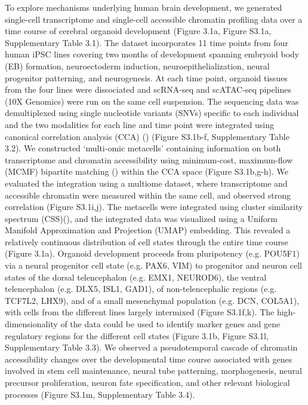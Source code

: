 To explore mechanisms underlying human brain development, we generated single-cell transcriptome and single-cell accessible chromatin profiling data over a time course of cerebral organoid development (Figure 3.1a, Figure S3.1a, Supplementary Table 3.1). The dataset incorporates 11 time points from four human iPSC lines covering two months of development spanning embryoid body (EB) formation, neuroectoderm induction, neuroepithelialization, neural progenitor patterning, and neurogenesis. At each time point, organoid tissues from the four lines were dissociated and scRNA-seq and scATAC-seq pipelines (10X Genomics) were run on the same cell suspension. The sequencing data was demultiplexed using single nucleotide variants (SNVs) specific to each individual and the two modalities for each line and time point were integrated using canonical correlation analysis (CCA) (\cite{stuart_comprehensive_2019}) (Figure S3.1b-f, Supplementary Table 3.2). We constructed ‘multi-omic metacells' containing information on both transcriptome and chromatin accessibility using minimum-cost, maximum-flow (MCMF) bipartite matching (\cite{stark_scim_2020}) within the CCA space (Figure S3.1b,g-h). We evaluated the integration using a multiome dataset, where transcriptome and accessible chromatin were measured within the same cell, and observed strong correlation (Figure S3.1i,j). The metacells were integrated using cluster similarity spectrum (CSS)(\cite{he_css_2020}), and the integrated data was visualized using a Uniform Manifold Approximation and Projection (UMAP) embedding. This revealed a relatively continuous distribution of cell states through the entire time course (Figure 3.1a). Organoid development proceeds from pluripotency (e.g. POU5F1) via a neural progenitor cell state (e.g. PAX6, VIM) to progenitor and neuron cell states of the dorsal telencephalon (e.g. EMX1, NEUROD6), the ventral telencephalon (e.g. DLX5, ISL1, GAD1), of non-telencephalic regions (e.g. TCF7L2, LHX9), and of a small mesenchymal population (e.g. DCN, COL5A1), with cells from the different lines largely intermixed (Figure S3.1f,k). The high-dimensionality of the data could be used to identify marker genes and gene regulatory regions for the different cell states (Figure 3.1b, Figure S3.1l, Supplementary Table 3.3). We observed a pseudotemporal cascade of chromatin accessibility changes over the developmental time course associated with genes involved in stem cell maintenance, neural tube patterning, morphogenesis, neural precursor proliferation, neuron fate specification, and other relevant biological processes (Figure S3.1m, Supplementary Table 3.4).

